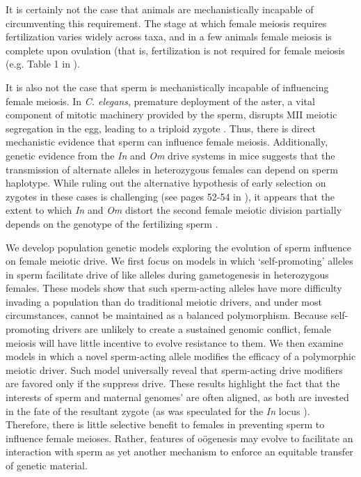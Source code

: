 \documentclass{pnastwo}
\begin{document}
\begin{article}
It is certainly not the case that animals are mechanistically incapable of circumventing this requirement.
The stage at which female meiosis requires fertilization varies widely across taxa, and in a few animals  
	female meiosis is complete upon ovulation (that is, fertilization is not required for female meiosis (e.g. Table 1 in \cite {Masui_book}). 

It is also not the case that sperm is mechanistically incapable of influencing female meiosis.
In \emph{C. elegans}, premature deployment of the aster, a vital component of mitotic
machinery provided by the sperm, disrupts MII meiotic segregation
in the egg, leading to a triploid zygote \cite{McNally2012}. 
Thus, there is direct mechanistic evidence that sperm can influence female meiosis.
 Additionally, genetic evidence from the \emph{In} and \emph{Om}  drive systems in mice suggests that the 
 transmission of alternate alleles in heterozygous females can depend on sperm haplotype.  
 While ruling out the alternative hypothesis of early selection on zygotes in these cases is challenging (see pages 52-54 in \cite{Burt2006}), it appears that the extent to which \emph{In} and \emph{Om} distort the second female meiotic division partially depends on the genotype of the fertilizing sperm \cite{Agulnik1993,Wu2005}.  


We develop population genetic models exploring the evolution of sperm influence on female meiotic drive. 
We first focus on models in which `self-promoting' alleles in
  sperm facilitate drive of like alleles during gametogenesis in heterozygous females. 
These models show that such sperm-acting alleles 
	have more difficulty invading a population than do traditional meiotic drivers, 
	 and under most circumstances, cannot be maintained as a balanced polymorphism.
Because self-promoting drivers are unlikely to create a sustained genomic conflict, 
	female meiosis will have little incentive to evolve resistance to them.
We then examine models in which a novel sperm-acting allele modifies the efficacy of a polymorphic meiotic driver. 
Such model universally reveal that sperm-acting drive modifiers are favored only if the suppress drive. 
These results highlight the fact that the interests of sperm and maternal  genomes' are often aligned, as both are invested in the fate of the resultant zygote (as was speculated for the \emph{In} locus \cite{Pomiankowski1993}).
Therefore, there is little selective benefit to females in preventing sperm to influence female meioses.
Rather, features of o\"{o}genesis  may evolve to facilitate an interaction with sperm
	as yet another mechanism to enforce an equitable transfer of genetic material.



\end{article}
\end{document}
